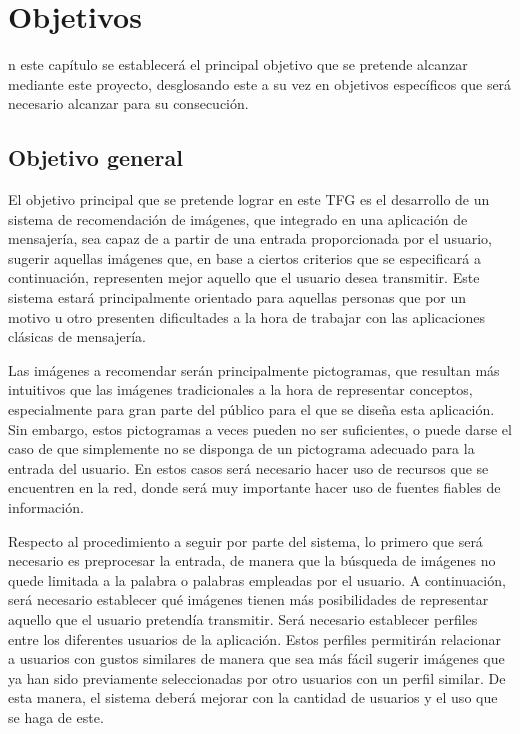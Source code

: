 \chapter{Objetivos}
\label{chap:objetivos}

\noindent
{}n este capítulo se establecerá el principal objetivo que se pretende alcanzar mediante este proyecto, desglosando este a su vez en objetivos específicos que será necesario alcanzar para su consecución.

\section{Objetivo general}

El objetivo principal que se pretende lograr en este \ac{TFG} es el desarrollo de un sistema de recomendación de imágenes, que integrado en una aplicación de mensajería, sea capaz de a partir de una entrada proporcionada por el usuario, sugerir aquellas imágenes que, en base a ciertos criterios que se especificará a continuación, representen mejor aquello que el usuario desea transmitir. Este sistema estará principalmente orientado para aquellas personas que por un motivo u otro presenten dificultades a la hora de trabajar con las aplicaciones clásicas de mensajería.

Las imágenes a recomendar serán principalmente pictogramas, que resultan más intuitivos que las imágenes tradicionales a la hora de representar conceptos, especialmente para gran parte del público para el que se diseña esta aplicación. Sin embargo, estos pictogramas a veces pueden no ser suficientes, o puede darse el caso de que simplemente no se disponga de un pictograma adecuado para la entrada del usuario. En estos casos será necesario hacer uso de recursos que se encuentren en la red, donde será muy importante hacer uso de fuentes fiables de información.

Respecto al procedimiento a seguir por parte del sistema, lo primero que será necesario es preprocesar la entrada, de manera que la búsqueda de imágenes no quede limitada a la palabra o palabras empleadas por el usuario. A continuación, será necesario establecer qué imágenes tienen más posibilidades de representar aquello que el usuario pretendía transmitir. Será necesario establecer perfiles entre los diferentes usuarios de la aplicación. Estos perfiles permitirán relacionar a usuarios con gustos similares de manera que sea más fácil sugerir imágenes que ya han sido previamente seleccionadas por otro usuarios con un perfil similar. De esta manera, el sistema deberá mejorar con la cantidad de usuarios y el uso que se haga de este.

